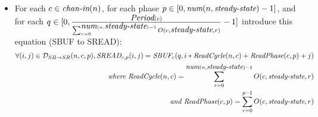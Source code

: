 \begin{itemize}
\item For each $c \in \mbox{\it chan-in}(n)$, for each phase $p \in [0,
\mbox{\it num}(n, \mbox{\it steady-state})-1]$, and for each $q \in [0,
\frac{\mbox{\it Period}(c)}{\sum_{r=0}^{\mbox{\it num}(n, \mbox{\it steady-state})-1}
O(c, \mbox{\it steady-state}, r)}-1]$ introduce this equation (SBUF to
SREAD):
\begin{align*}
\forall (i,j) \in {\cal D}_{SB \rightarrow SR}(n,c,p), 
\mt{SREAD}_{c, p}(i,j) = 
    \mt{SBUF}_{c}(q,i*\mt{ReadCycle}(n,c) + \mt{ReadPhase}(c,p) + j) \\
%
\mt{where ReadCycle}(n,c) = \sum_{r=0}^{\mt{num}(n, \mt{steady-state})-1} O(c, \mt{steady-state}, r) \\
\mt{and ReadPhase}(c,p) = \sum_{r=0}^{p-1} O(c, \mt{steady-state}, r)
\end{align*}

%

\end{itemize}






